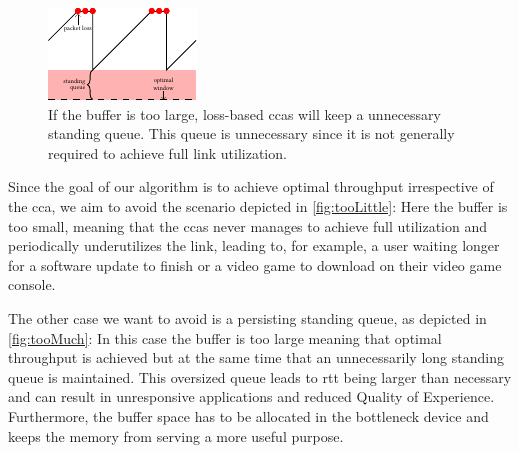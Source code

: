 \documentclass[10pt,sigconf,letterpaper,dvipsnames\ifx\removeHeaders\tempYes ,nonacm\fi]{acmart}
\begin{document}
\begin{figure}[h]
\includegraphics[width=\columnwidth]{figures/traq_illustration_too_much.pdf}
\caption{If the buffer is too large, loss-based \glspl{cca} will keep a unnecessary standing queue. This queue is unnecessary since it is not generally required to achieve full link utilization.}
\label{fig:tooMuch}
\end{figure}

Since the goal of our algorithm is to achieve optimal throughput irrespective of the \gls{cca}, we aim to avoid the scenario depicted in \autoref{fig:tooLittle}: Here the buffer is too small, meaning that the \glspl{cca} never manages to achieve full utilization and periodically underutilizes the link, leading to, for example, a user waiting longer for a software update to finish or a video game to download on their video game console. 

The other case we want to avoid is a persisting standing queue, as depicted in \autoref{fig:tooMuch}: In this case the buffer is too large meaning that optimal throughput is achieved but at the same time that an unnecessarily long standing queue is maintained. This oversized queue leads to \gls{rtt} being larger than necessary and can result in unresponsive applications and reduced Quality of Experience. Furthermore, the buffer space has to be allocated in the bottleneck device and keeps the memory from serving a more useful purpose. 
\end{document}
